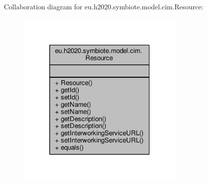 Collaboration diagram for eu.\+h2020.\+symbiote.\+model.\+cim.\+Resource\+:
\nopagebreak
\begin{figure}[H]
\begin{center}
\leavevmode
\includegraphics[width=232pt]{classeu_1_1h2020_1_1symbiote_1_1model_1_1cim_1_1Resource__coll__graph}
\end{center}
\end{figure}
